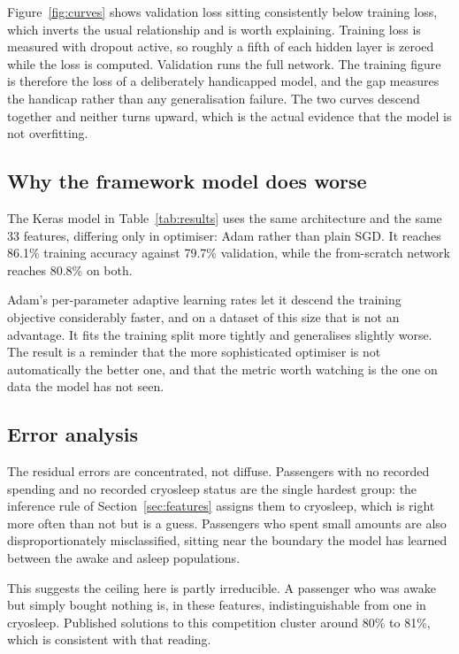 \documentclass[11pt,a4paper]{article}
\begin{document}
Figure~\ref{fig:curves} shows validation loss sitting consistently below training
loss, which inverts the usual relationship and is worth explaining. Training loss
is measured with dropout active, so roughly a fifth of each hidden layer is
zeroed while the loss is computed. Validation runs the full network. The
training figure is therefore the loss of a deliberately handicapped model, and
the gap measures the handicap rather than any generalisation failure. The two
curves descend together and neither turns upward, which is the actual evidence
that the model is not overfitting.

\subsection{Why the framework model does worse}

The Keras model in Table~\ref{tab:results} uses the same architecture and the
same 33 features, differing only in optimiser: Adam rather than plain SGD. It
reaches 86.1\% training accuracy against 79.7\% validation, while the
from-scratch network reaches 80.8\% on both.

Adam's per-parameter adaptive learning rates let it descend the training
objective considerably faster, and on a dataset of this size that is not an
advantage. It fits the training split more tightly and generalises slightly
worse. The result is a reminder that the more sophisticated optimiser is not
automatically the better one, and that the metric worth watching is the one on
data the model has not seen.

\subsection{Error analysis}

The residual errors are concentrated, not diffuse. Passengers with no recorded
spending and no recorded cryosleep status are the single hardest group: the
inference rule of Section~\ref{sec:features} assigns them to cryosleep, which is
right more often than not but is a guess. Passengers who spent small amounts are
also disproportionately misclassified, sitting near the boundary the model has
learned between the awake and asleep populations.

This suggests the ceiling here is partly irreducible. A passenger who was awake
but simply bought nothing is, in these features, indistinguishable from one in
cryosleep. Published solutions to this competition cluster around 80\% to 81\%,
which is consistent with that reading.
\end{document}

